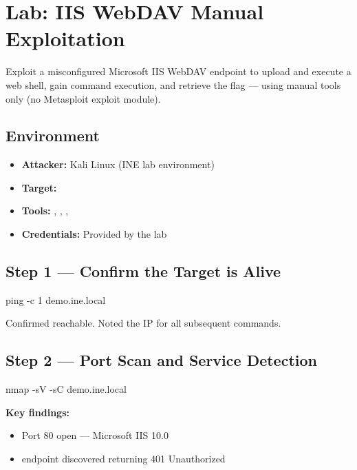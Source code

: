 \chapter{Lab: IIS WebDAV Manual Exploitation}
\label{lab:webdav_manual}

\begin{notebox}
Exploit a misconfigured Microsoft IIS WebDAV endpoint to upload and execute a web
shell, gain command execution, and retrieve the flag --- using manual tools only
(no Metasploit exploit module).
\end{notebox}

\section*{Environment}
\begin{itemize}
  \item \textbf{Attacker:} Kali Linux (INE lab environment)
  \item \textbf{Target:} 
  \item \textbf{Tools:} , , , 
  \item \textbf{Credentials:} Provided by the lab
\end{itemize}

\section*{Step 1 --- Confirm the Target is Alive}

\begin{termbox}
ping -c 1 demo.ine.local
\end{termbox}

Confirmed reachable. Noted the IP for all subsequent commands.

\section*{Step 2 --- Port Scan and Service Detection}

\begin{termbox}
nmap -sV -sC demo.ine.local
\end{termbox}

\textbf{Key findings:}
\begin{itemize}
  \item Port 80 open --- Microsoft IIS 10.0
  \item {} endpoint discovered returning 401 Unauthorized
\end{itemize}

